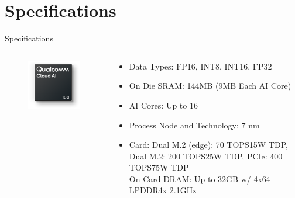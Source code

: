 \documentclass[12pt]{beamer}
\begin{document}
\section{Specifications}
\begin{frame}{Specifications}
    \begin{columns}
        \begin{column}{0.4\linewidth}
            \begin{figure}[H]
                \centering
                \includegraphics[width=0.8\columnwidth]{6.png}
            \end{figure}
        \end{column}
        \begin{column}{0.6\linewidth}
            \begin{itemize}
                \small
                \item Data Types: FP16, INT8, INT16, FP32
                \item On Die SRAM: 144MB (9MB Each AI Core)
                \item AI Cores: Up to 16
                \item Process Node and Technology: 7 nm
                \item Card: Dual M.2 (edge): 70 TOPS\@15W TDP, Dual M.2: 200 TOPS\@ 25W TDP, PCIe: 400 TOPS\@ 75W TDP\\
                On Card DRAM: Up to 32GB w/ 4x64 LPDDR4x \@ 2.1GHz \cite{qualcomm100}
            \end{itemize}
        \end{column}
    \end{columns}
\end{frame}
\end{document}
